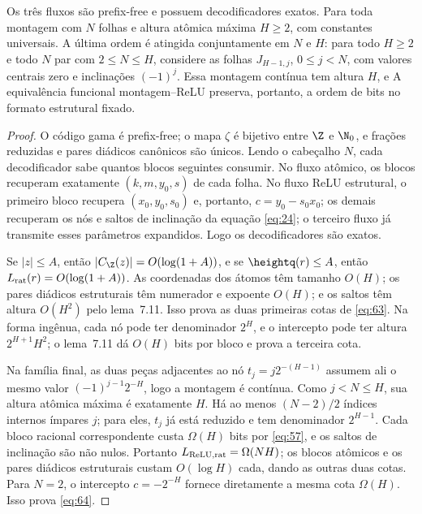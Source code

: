 \begin{teorema}
Os três fluxos são prefix-free e possuem decodificadores exatos. Para toda montagem com $N$ folhas e altura atômica máxima $H\ge2$,
com constantes universais. A última ordem é atingida conjuntamente em $N$ e $H$: para todo $H\ge2$ e todo $N$ par com $2\le N\le H$, considere as folhas $J_{H-1,j}$, $0\le j<N$, com valores centrais zero e inclinações $(-1)^j$. Essa montagem contínua tem altura $H$, e
A equivalência funcional montagem--ReLU preserva, portanto, a ordem de bits no formato estrutural fixado.
\end{teorema}
\begin{proof}
O código gama é prefix-free; o mapa $\zeta$ é bijetivo entre $\Z$ e $\N_0$, e frações reduzidas e pares diádicos canônicos são únicos. Lendo o cabeçalho $N$, cada decodificador sabe quantos blocos seguintes consumir. No fluxo atômico, os blocos recuperam exatamente $(k,m,y_0,s)$ de cada folha. No fluxo ReLU estrutural, o primeiro bloco recupera $(x_0,y_0,s_0)$ e, portanto, $c=y_0-s_0x_0$; os demais recuperam os nós e saltos de inclinação da equação \eqref{eq:24}; o terceiro fluxo já transmite esses parâmetros expandidos. Logo os decodificadores são exatos.

Se $|z|\le A$, então $|C_{\Z}(z)|=O(\log(1+A))$, e se $\heightq(r)\le A$, então $L_{\rm rat}(r)=O(\log(1+A))$. As coordenadas dos átomos têm tamanho $O(H)$; os pares diádicos estruturais têm numerador e expoente $O(H)$; e os saltos têm altura $O(H^2)$ pelo lema~7.11. Isso prova as duas primeiras cotas de \eqref{eq:63}. Na forma ingênua, cada nó pode ter denominador $2^H$, e o intercepto pode ter altura $2^{H+1}H^2$; o lema~7.11 dá $O(H)$ bits por bloco e prova a terceira cota.

Na família final, as duas peças adjacentes ao nó $t_j=j2^{-(H-1)}$ assumem ali o mesmo valor $(-1)^{j-1}2^{-H}$, logo a montagem é contínua. Como $j<N\le H$, sua altura atômica máxima é exatamente $H$. Há ao menos $(N-2)/2$ índices internos ímpares $j$; para eles, $t_j$ já está reduzido e tem denominador $2^{H-1}$. Cada bloco racional correspondente custa $\Omega(H)$ bits por \eqref{eq:57}, e os saltos de inclinação são não nulos. Portanto $L_{\rm ReLU,rat}=\Omega(NH)$; os blocos atômicos e os pares diádicos estruturais custam $O(\log H)$ cada, dando as outras duas cotas. Para $N=2$, o intercepto $c=-2^{-H}$ fornece diretamente a mesma cota $\Omega(H)$. Isso prova \eqref{eq:64}.
\end{proof}



